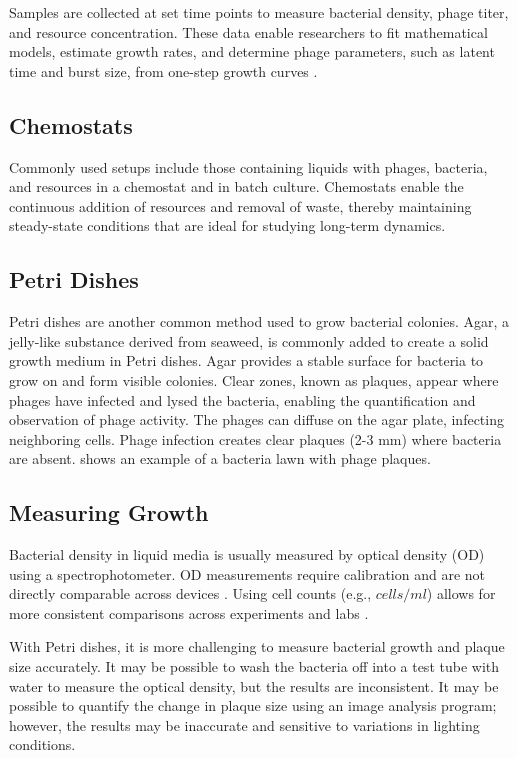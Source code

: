 Samples are collected at set time points to measure bacterial density, phage titer, and resource concentration. 
These data enable researchers to fit mathematical models, estimate growth rates, and determine phage parameters, such as latent time and burst size, from one-step growth curves \cite{gengUsingBacterialPopulation2024, mullaExtremeDiversityPhage2024}.

\subsection{Chemostats}
Commonly used setups include those containing liquids with phages, bacteria, and resources in a chemostat and in batch culture. 
Chemostats enable the continuous addition of resources and removal of waste, thereby maintaining steady-state conditions that are ideal for studying long-term dynamics.

\subsection{Petri Dishes}
Petri dishes are another common method used to grow bacterial colonies. 
Agar, a jelly-like substance derived from seaweed, is commonly added to create a solid growth medium in Petri dishes. 
Agar provides a stable surface for bacteria to grow on and form visible colonies. 
Clear zones, known as plaques, appear where phages have infected and lysed the bacteria, enabling the quantification and observation of phage activity. 
The phages can diffuse on the agar plate, infecting neighboring cells. 
Phage infection creates clear plaques (2-3 mm) where bacteria are absent. 
 shows an example of a bacteria lawn with phage plaques. 

\subsection{Measuring Growth}
Bacterial density in liquid media is usually measured by optical density (OD) using a spectrophotometer. 
OD measurements require calibration and are not directly comparable across devices \cite{bealRobustEstimationBacterial2020}. 
Using cell counts (e.g., $cells/ml$) allows for more consistent comparisons across experiments and labs \cite{miraEstimatingMicrobialPopulation2022}.

With Petri dishes, it is more challenging to measure bacterial growth and plaque size accurately. 
It may be possible to wash the bacteria off into a test tube with water to measure the optical density, but the results are inconsistent. 
It may be possible to quantify the change in plaque size using an image analysis program; however, the results may be inaccurate and sensitive to variations in lighting conditions. 

